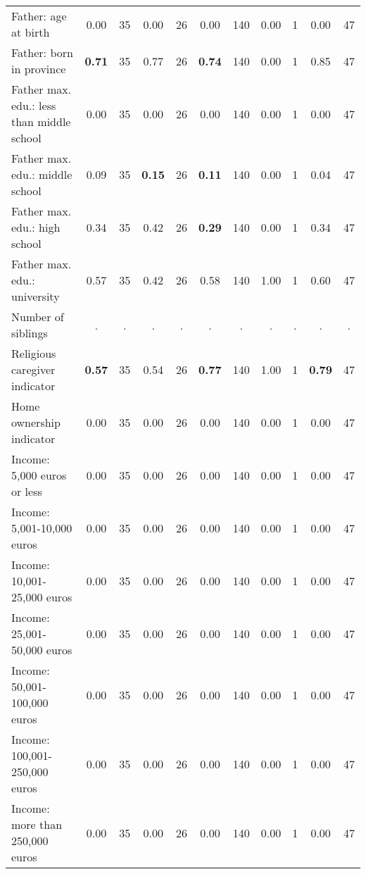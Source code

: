 \begin{tabular}{l c c c c c c c c c c}
Father: age at birth &      0.00 &        35 &      0.00 &        26 &      0.00 &       140 &      0.00 &         1 &      0.00 &        47 \\
Father: born in province & \textbf{     0.71} &        35 &      0.77 &        26 & \textbf{     0.74} &       140 &      0.00 &         1 &      0.85 &        47 \\
Father max. edu.: less than middle school &      0.00 &        35 &      0.00 &        26 &      0.00 &       140 &      0.00 &         1 &      0.00 &        47 \\
Father max. edu.: middle school &      0.09 &        35 & \textbf{     0.15} &        26 & \textbf{     0.11} &       140 &      0.00 &         1 &      0.04 &        47 \\
Father max. edu.: high school &      0.34 &        35 &      0.42 &        26 & \textbf{     0.29} &       140 &      0.00 &         1 &      0.34 &        47 \\
Father max. edu.: university &      0.57 &        35 &      0.42 &        26 &      0.58 &       140 &      1.00 &         1 &      0.60 &        47 \\
Number of siblings &         . & . &         . & . &         . & . &         . & . &         . & . \\
Religious caregiver indicator & \textbf{     0.57} &        35 &      0.54 &        26 & \textbf{     0.77} &       140 &      1.00 &         1 & \textbf{     0.79} &        47 \\
Home ownership indicator &      0.00 &        35 &      0.00 &        26 &      0.00 &       140 &      0.00 &         1 &      0.00 &        47 \\
Income: 5,000 euros or less &      0.00 &        35 &      0.00 &        26 &      0.00 &       140 &      0.00 &         1 &      0.00 &        47 \\
Income: 5,001-10,000 euros &      0.00 &        35 &      0.00 &        26 &      0.00 &       140 &      0.00 &         1 &      0.00 &        47 \\
Income: 10,001-25,000 euros &      0.00 &        35 &      0.00 &        26 &      0.00 &       140 &      0.00 &         1 &      0.00 &        47 \\
Income: 25,001-50,000 euros &      0.00 &        35 &      0.00 &        26 &      0.00 &       140 &      0.00 &         1 &      0.00 &        47 \\
Income: 50,001-100,000 euros &      0.00 &        35 &      0.00 &        26 &      0.00 &       140 &      0.00 &         1 &      0.00 &        47 \\
Income: 100,001-250,000 euros &      0.00 &        35 &      0.00 &        26 &      0.00 &       140 &      0.00 &         1 &      0.00 &        47 \\
Income: more than 250,000 euros &      0.00 &        35 &      0.00 &        26 &      0.00 &       140 &      0.00 &         1 &      0.00 &        47 \\
\bottomrule
\end{tabular}
